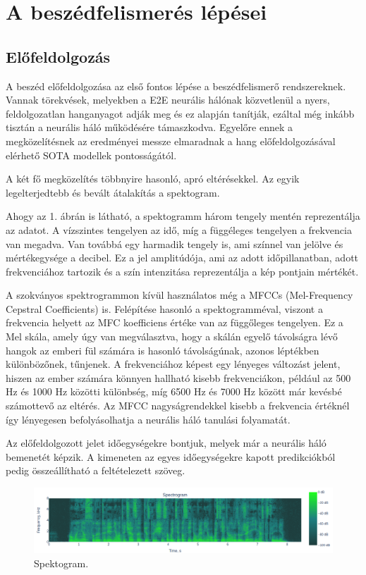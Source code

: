 \section{A beszédfelismerés lépései}

\subsection{Előfeldolgozás}

A beszéd előfeldolgozása az első fontos lépése a beszédfelismerő rendszereknek. Vannak törekvések, melyekben a E2E neurális hálónak közvetlenül a nyers, feldolgozatlan hanganyagot adják meg és ez alapján tanítják\cite{Zeghidour2018}, ezáltal még inkább tisztán a neurális háló működésére támaszkodva. Egyelőre ennek a megközelítésnek az eredményei messze elmaradnak a hang előfeldolgozásával elérhető SOTA modellek pontosságától.

A két fő megközelítés többnyire hasonló, apró eltérésekkel. Az egyik legelterjedtebb és bevált átalakítás a spektogram.

Ahogy az 1. ábrán is látható, a spektogramm három tengely mentén reprezentálja az adatot. A vízszintes tengelyen az idő, míg a függéleges tengelyen a frekvencia van megadva. Van továbbá egy harmadik tengely is, ami színnel van jelölve és mértékegysége a decibel. Ez a jel amplitúdója, ami az adott időpillanatban, adott frekvenciához tartozik és a szín intenzitása reprezentálja a kép pontjain mértékét.

A szokványos spektrogrammon kívül használatos még a MFCCs (Mel-Frequency Cepstral Coefficients) is. Felépítése hasonló a spektogramméval, viszont a frekvencia helyett az MFC koefficiens \cite {mfcc} értéke van az függőleges tengelyen. Ez a Mel skála, amely úgy van megválasztva, hogy a skálán egyelő távolságra lévő hangok az emberi fül számára is hasonló távolságúnak, azonos léptékben különbözőnek, tűnjenek. A frekvenciához képest egy lényeges változást jelent, hiszen az ember számára könnyen hallható kisebb frekvenciákon, például az 500 Hz és 1000 Hz közötti különbség, míg 6500 Hz és 7000 Hz között már kevésbé számottevő az eltérés. Az MFCC nagyságrendekkel kisebb a frekvencia értéknél így lényegesen befolyásolhatja a neurális háló tanulási folyamatát.

Az előfeldolgozott jelet időegységekre bontjuk, melyek már a neurális háló bemenetét képzik. A kimeneten az egyes időegységekre kapott predikciókból pedig összeállítható a feltételezett szöveg.

\begin{figure}[!ht]
\centering
\includegraphics[width=150mm, keepaspectratio]{figures/spectogram.png}
\caption{Spektogram.}
\end{figure}


